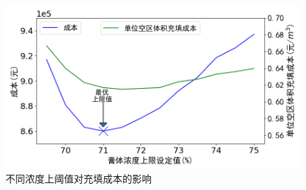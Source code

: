
\begin{figure}[htb]
    \centering
    \includegraphics[width=0.8\linewidth]{figures/chapter4/cost.png}
    \caption{不同浓度上阈值对充填成本的影响}
    \label{fig:4_paste_concentration}
\end{figure}



